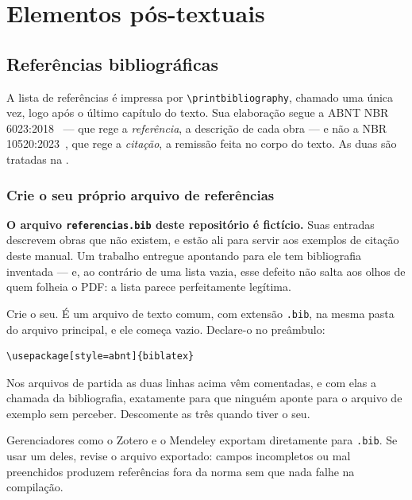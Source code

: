 \chapter{Elementos pós-textuais}\label{cap:postextuais}

\section{Referências bibliográficas}\label{sec:bibliografia}

A lista de referências é impressa por \verb|\printbibliography|, chamado uma única vez, logo após o
último capítulo do texto. Sua elaboração segue a ABNT NBR 6023:2018~\cite{nbr6023:2018} --- que rege
a \emph{referência}, a descrição de cada obra --- e não a NBR 10520:2023~\cite{nbr10520:2023}, que
rege a \emph{citação}, a remissão feita no corpo do texto. As duas são tratadas na
.

\subsection{Crie o seu próprio arquivo de referências}\label{ssc:proprio-bib}

\textbf{O arquivo \texttt{referencias.bib} deste repositório é fictício.} Suas entradas descrevem
obras que não existem, e estão ali para servir aos exemplos de citação deste manual. Um trabalho
entregue apontando para ele tem bibliografia inventada --- e, ao contrário de uma lista vazia, esse
defeito não salta aos olhos de quem folheia o PDF: a lista parece perfeitamente legítima.

Crie o seu. É um arquivo de texto comum, com extensão \texttt{.bib}, na mesma pasta do arquivo
principal, e ele começa vazio. Declare-o no preâmbulo:

\begin{Verbatim}[fontsize=\small]
\usepackage[style=abnt]{biblatex}

\end{Verbatim}

Nos arquivos de partida as duas linhas acima vêm comentadas, e com elas a chamada da
bibliografia, exatamente para que ninguém aponte para o arquivo de exemplo sem perceber.
Descomente as três quando tiver o seu.

Gerenciadores como o Zotero e o Mendeley exportam diretamente para \texttt{.bib}. Se usar um deles,
revise o arquivo exportado: campos incompletos ou mal preenchidos produzem referências fora da
norma sem que nada falhe na compilação.

